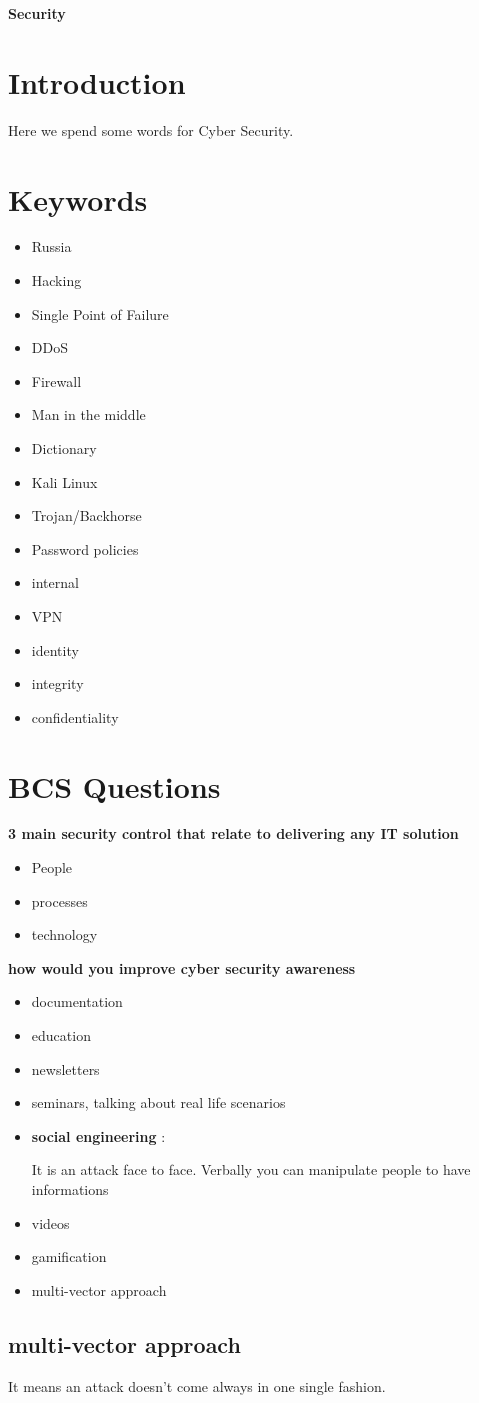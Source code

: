 \documentclass[a4paper,12pt]{article}
\begin{document}
\textbf{Security}


\tableofcontents
\clearpage

 
\section{Introduction}
Here we spend some words for Cyber Security.
\section{Keywords}

\begin{itemize}
\item Russia
\item Hacking
\item Single Point of Failure
\item DDoS
\item Firewall
\item Man in the middle
\item Dictionary
\item Kali Linux
\item Trojan/Backhorse
\item Password policies
\item internal
\item VPN
\item identity 
\item integrity
\item confidentiality
\end{itemize}

\section{BCS Questions}

\textbf {3 main security control that relate to delivering any IT solution}
\begin{itemize}
\item People
\item processes
\item technology 
\end{itemize}


\textbf {how would you improve cyber security awareness}
\begin{itemize}
\item documentation
\item education
\item newsletters
\item seminars, talking about real life scenarios
\item \textbf{social engineering}
:

It is an attack face to face. Verbally you can manipulate people to have informations
\item videos
\item gamification
\item multi-vector approach
\end{itemize}

\subsection{multi-vector approach}
It means an attack doesn't come always in one single fashion. 


\clearpage

\printindex
\end{document}
